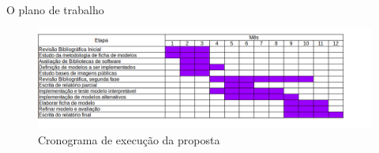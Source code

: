 \documentclass[12pt]{article}
\begin{document}
O plano de trabalho


\begin{figure}[htb]
 \centering
 \includegraphics[width=1.0\textwidth]{images/crono2022}
 \caption{Cronograma de execução da proposta}
 \label{fig:crono}
\end{figure}

\bigskip


\end{document}
